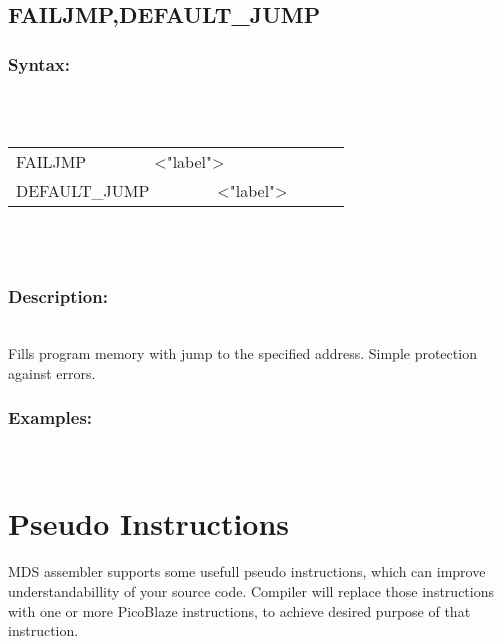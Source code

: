         \subsection{FAILJMP,DEFAULT\_JUMP}
        \subsubsection{Syntax:}\\
        \\ {
                \texttt{}
                \begin{tabular}[h!]{llll}
                        { \color{highlight_directive} FAILJMP }\verb`       `{ \color{highlight_string} <"label"> }\\
                        { \color{highlight_directive} DEFAULT\_JUMP }\verb`       `{ \color{highlight_string} <"label"> }\\
                \end{tabular}
            }\\
            \\
        \subsubsection{Description:}\\
        Fills program memory with jump to the specified address. Simple protection against errors.

        \subsubsection{Examples:}\\
            \begin{code}[h!]
                \verb'    'directive}\verb'FAILJMP'}\verb`       `{ \color{highlight_string} start }
                \verb'    'directive}\verb'DEFAULT\_JUMP'}\verb`       `{ \color{highlight_string} 0x000> }
                \caption{END directive}
            \end{code}

        \section{Pseudo Instructions}
        MDS assembler supports some usefull pseudo instructions, which can improve understandabillity of your source code.
        Compiler will replace those instructions with one or more PicoBlaze instructions, to achieve desired purpose of that instruction.

